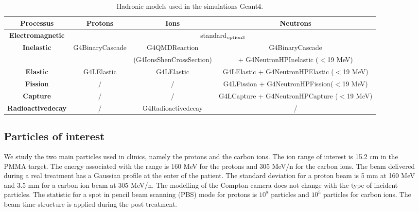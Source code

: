 \documentclass[12pt]{iopart}
\begin{document}
\begin{table}[ht]
\label{physlist_ion}
\caption{Hadronic models used in the simulations Geant4.}
\begin{scriptsize}
\begin{center}
\renewcommand{\arraystretch}{1.2}
\begin{tabular} {cccc}\hline
\textbf{Processus} & \textbf{Protons} & \textbf{Ions} & \textbf{Neutrons} \\ \hline 
\textbf{Electromagnetic} & \multicolumn{3}{c}{standard$_{\rm{option3}}$} \\ %
\textbf{Inelastic} & G4BinaryCascade & G4QMDReaction  &  G4BinaryCascade  \\ 
 & & (G4IonsShenCrossSection)&+ G4NeutronHPInelastic ($<$19 MeV)\\ %
\textbf{Elastic} & G4LElastic & G4LElastic & G4LElastic + G4NeutronHPElastic ($<$19 MeV)\\ %
\textbf{Fission} & / & / & G4LFission + G4NeutronHPFission($<$19 MeV) \\ %
\textbf{Capture} & / & / & G4LCapture +  G4NeutronHPCapture ($<$19 MeV) \\ %
\textbf{Radioactivedecay} & / & G4Radioactivedecay & / \\ \hline
\end{tabular}
\end{center}
\end{scriptsize}
\label{table:table_modele_physic_CC_simulation_Hadronth}
\end{table}

\subsection{Particles of interest}
\label{subsection:Particules_Etudiees_CC_hadrontherapy_Geant4}

We study the two main particles used in clinics, namely the protons and the carbon ions. The ion range of interest is 15.2 cm in the PMMA target. The energy associated with the range is 160 MeV for the protons and 305 MeV/n for the carbon ions. The beam delivered during a real treatment has a Gaussian profile at the enter of the patient. The standard deviation for a proton beam is 5 mm at 160 MeV and 3.5 mm for a carbon ion beam at 305 MeV/n. The modelling of the Compton camera does not change with the type of incident particles. The statistic for a spot in pencil beam scanning (PBS) mode for protons is $10^8$ particles and $10^5$ particles for carbon ions. The beam time structure is applied during the post treatment.\newline
\end{document}
